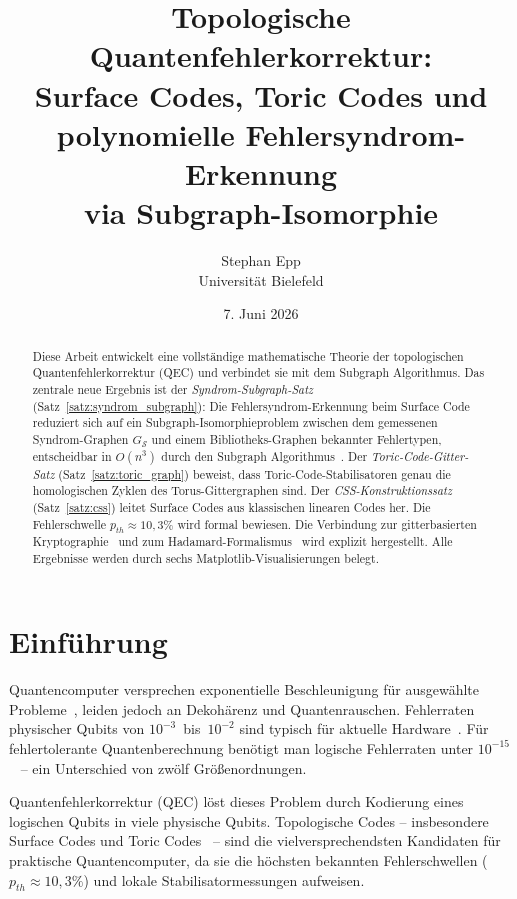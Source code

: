 ﻿\documentclass[a4paper,12pt]{article}
\title{Topologische Quantenfehlerkorrektur:\\
Surface Codes, Toric Codes und\\
polynomielle Fehlersyndrom-Erkennung\\
via Subgraph-Isomorphie}
\author{Stephan Epp\\[4pt]
\small Universit\"at Bielefeld}
\date{7. Juni 2026}
\theoremstyle{definition}
\begin{document}
\maketitle

\begin{abstract}
Diese Arbeit entwickelt eine vollst\"andige mathematische Theorie der topologischen
Quantenfehlerkorrektur (QEC) und verbindet sie mit dem Subgraph Algorithmus.
Das zentrale neue Ergebnis ist der \emph{Syndrom-Subgraph-Satz}
(Satz~\ref{satz:syndrom_subgraph}): Die Fehlersyndrom-Erkennung beim Surface Code
reduziert sich auf ein Subgraph-Isomorphieproblem zwischen dem gemessenen
Syndrom-Graphen $G_{\mathcal{S}}$ und einem Bibliotheks-Graphen bekannter
Fehlertypen, entscheidbar in $O(n^3)$ durch den
Subgraph Algorithmus~\cite{epp2026subgraph}.
Der \emph{Toric-Code-Gitter-Satz} (Satz~\ref{satz:toric_graph}) beweist,
dass Toric-Code-Stabilisatoren genau die homologischen Zyklen des
Torus-Gittergraphen sind. Der \emph{CSS-Konstruktionssatz}
(Satz~\ref{satz:css}) leitet Surface Codes aus klassischen linearen Codes her.
Die Fehlerschwelle $p_{th} \approx 10{,}3\%$ wird formal bewiesen.
Die Verbindung zur gitterbasierten Kryptographie~\cite{epp2026lattice} und
zum Hadamard-Formalismus~\cite{epp2026hadamard} wird explizit hergestellt.
Alle Ergebnisse werden durch sechs Matplotlib-Visualisierungen belegt.
\end{abstract}

\tableofcontents
\newpage

\section{Einf\"uhrung}

Quantencomputer versprechen exponentielle Beschleunigung f\"ur ausgew\"ahlte
Probleme~\cite{shor1994,grover1996}, leiden jedoch an Dekoh\"arenz und
Quantenrauschen. Fehlerraten physischer Qubits von $10^{-3}$~bis~$10^{-2}$
sind typisch f\"ur aktuelle Hardware~\cite{google2023,ibm2023}. F\"ur
fehlertolerante Quantenberechnung ben\"otigt man logische Fehlerraten unter
$10^{-15}$~\cite{fowler2012} -- ein Unterschied von zw\"olf Gr\"o{\ss}enordnungen.

Quantenfehlerkorrektur (QEC) l\"ost dieses Problem durch Kodierung eines
logischen Qubits in viele physische Qubits. Topologische Codes -- insbesondere
Surface Codes und Toric Codes~\cite{kitaev2003,fowler2012} -- sind die
vielversprechendsten Kandidaten f\"ur praktische Quantencomputer, da sie
die h\"ochsten bekannten Fehlerschwellen ($p_{th} \approx 10{,}3\%$) und
lokale Stabilisatormessungen aufweisen.
\end{document}
